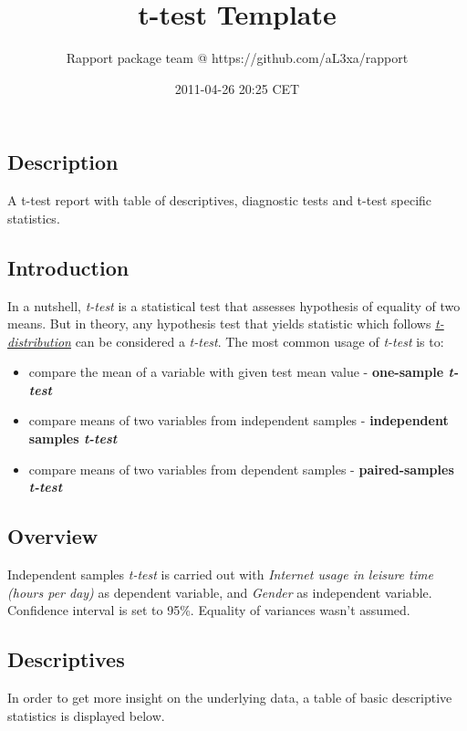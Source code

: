 \documentclass[]{article}
\title{t-test Template}
\author{Rapport package team @ https://github.com/aL3xa/rapport}
\date{2011-04-26 20:25 CET}
\begin{document}
\maketitle

\subsection{Description}

A t-test report with table of descriptives, diagnostic tests and t-test
specific statistics.

\subsection{Introduction}

In a nutshell, \emph{t-test} is a statistical test that assesses
hypothesis of equality of two means. But in theory, any hypothesis test
that yields statistic which follows
\href{https://en.wikipedia.org/wiki/Student\%27s\_t-distribution}{\emph{t-distribution}}
can be considered a \emph{t-test}. The most common usage of
\emph{t-test} is to:

\begin{itemize}
\item
  compare the mean of a variable with given test mean value -
  \textbf{one-sample \emph{t-test}}
\item
  compare means of two variables from independent samples -
  \textbf{independent samples \emph{t-test}}
\item
  compare means of two variables from dependent samples -
  \textbf{paired-samples \emph{t-test}}
\end{itemize}
\subsection{Overview}

Independent samples \emph{t-test} is carried out with \emph{Internet
usage in leisure time (hours per day)} as dependent variable, and
\emph{Gender} as independent variable. Confidence interval is set to
95\%. Equality of variances wasn't assumed.

\subsection{Descriptives}

In order to get more insight on the underlying data, a table of basic
descriptive statistics is displayed below.
\end{document}
